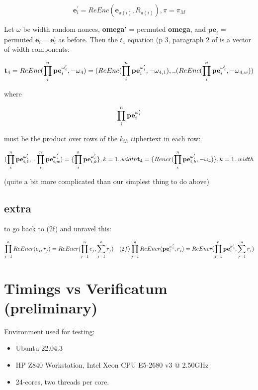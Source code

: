 \documentclass{article}
\begin{document}
\[
\textbf{e}_{i}^{\prime}=ReEnc(\textbf{e}_{\pi(i)},R_{\pi(i)}),\pi=\pi_{M}
\]

Let $\omega$ be width random nonces, \textbf{omega'} = permuted \textbf{omega},
and $\textbf{pe}_{i}$ = permuted $\textbf{e}_{i}=\textbf{e}_{i}^{\prime}$
as before. Then the $t_{4}$ equation (p 3, paragraph 2 of \cite{Haines19}
is a vector of width components:

\[
\textbf{t}_{4}=ReEnc(\prod_{i}^{n}\textbf{pe}_{i}^{\textbf{\ensuremath{\omega}}_{i}^{\prime}},-\textbf{\ensuremath{\omega}}_{4})=(ReEnc(\prod_{i}^{n}\textbf{pe}_{i}^{\textbf{\ensuremath{\omega}}_{i}^{\prime}},-\textbf{\ensuremath{\omega}}_{4,1}),..(ReEnc(\prod_{i}^{n}\textbf{pe}_{i}^{\textbf{\ensuremath{\omega}}_{i}^{\prime}},-\textbf{\ensuremath{\omega}}_{4,w}))
\]

where

\[
\prod_{i}^{n}\textbf{pe}_{i}^{\textbf{\ensuremath{\omega}}_{i}^{\prime}}
\]

must be the product over rows of the $k_{th}$ ciphertext in each
row:

\[
(\prod_{i}^{n}\textbf{pe}_{i,1}^{\textbf{\ensuremath{\omega}}_{i}^{\prime}},..\prod_{i}^{n}\textbf{pe}_{i,w}^{\textbf{\ensuremath{\omega}}_{i}^{\prime}})=\{\prod_{i}^{n}\textbf{pe}_{i,k}^{\textbf{\ensuremath{\omega}}_{i}^{\prime}}\},k=1..width\textbf{t}_{4}=\{Rencr(\prod_{i}^{n}\textbf{pe}_{i,k}^{\textbf{\ensuremath{\omega}}_{i}^{\prime}},-\textbf{\ensuremath{\omega}}_{4})\},k=1..width
\]

(quite a bit more complicated than our simplest thing to do above)

\subsection*{extra}

to go back to (2f) and unravel this:

\[
\prod_{j=1}^{n}ReEncr(e_{j},r_{j})=ReEncr(\prod_{j=1}^{n}e_{j},\sum_{j=1}^{n}r_{j})\ \ \ (2f)\prod_{j=1}^{n}ReEncr(\textbf{pe}_{i}^{\textbf{\ensuremath{\omega}}_{i}^{\prime}},r_{j})=ReEncr(\prod_{j=1}^{n}\textbf{pe}_{i}^{\textbf{\ensuremath{\omega}}_{i}^{\prime}},\sum_{j=1}^{n}r_{j})
\]


\section{Timings vs Verificatum (preliminary)}

Environment used for testing:
\begin{itemize}
\item Ubuntu 22.04.3 
\item HP Z840 Workstation, Intel Xeon CPU E5-2680 v3 @ 2.50GHz 
\item 24-cores, two threads per core. 
\end{itemize}
\end{document}
